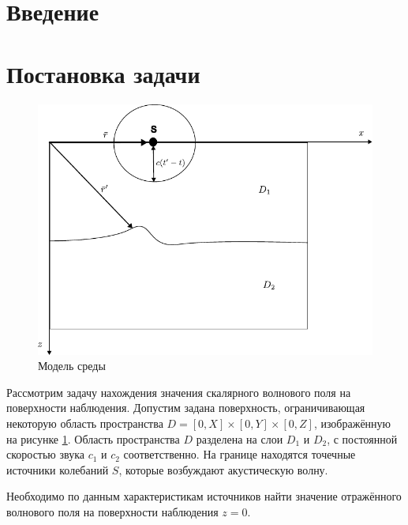 \documentclass[a4paper, fontsize=14pt]{article}
\begin{document}
 
	 \newpage \tableofcontents
	\newpage 
	\section*{Введение} 
	
	
	\newpage 
	\section{Постановка задачи} 
	\begin{figure}[h]
		
		\centering
		\includegraphics{migration_fig.pdf}
		
		\caption{Модель среды}
		\label{fig:mig}
	\end{figure}
	Рассмотрим задачу нахождения значения скалярного волнового поля на поверхности
	наблюдения.
	Допустим задана поверхность, ограничивающая некоторую область пространства
	$D=[0,X]\times [0,Y]\times [0,Z]$, изображённую на рисунке \ref{fig:mig}.
	Область пространства $D$ разделена на слои $D_1$ и $D_2$, с постоянной
	скоростью звука $c_1$ и $c_2$ соответственно.
	На границе находятся точечные источники колебаний $S$, которые возбуждают
	акустическую волну.
	
	Необходимо по данным характеристикам источников найти значение отражённого волнового поля
	на поверхности наблюдения $z=0$.
	
\end{document}
